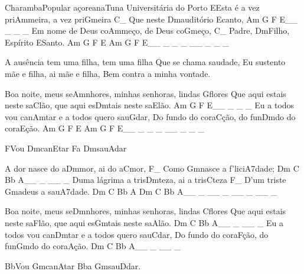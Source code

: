 \begin{musica}{Charamba}{Popular açoreana}{Tuna Universitária do Porto}
\ac{E}{Es}ta é a vez pri\ac{Am}{mei}ra, a vez pri\ac{G}{mei}ra \ac{C}{}_
Que neste \ac{Dm}{au}ditório \ac{E}{can}to, \ac{Am G F E}{}__ _ _ _
Em nome de Deus co\ac{Am}{me}ço, de Deus co\ac{G}{me}ço, \ac{C}{}_
Padre, \ac{Dm}{Fi}lho, Espírito \ac{E}{San}to. \ac{Am G F E Am G F E}{}__ _ _ _ __ _ _ _

A ausência tem uma filha, tem uma filha
Que se chama saudade,
Eu sustento mãe e filha, ai mãe e filha,
Bem contra a minha vontade.

Boa noite, meus se\ac{Am}{nho}res, minhas senhoras, lindas \ac{G}{flo}res
Que aqui estais neste sa\ac{C}{lão}, que aqui es\ac{Dm}{tais} neste sa\ac{E}{lão}. \ac{Am G F E}{}__ _ _ _
Eu a todos vou can\ac{Am}{tar} e a todos quero sau\ac{G}{dar},
Do fundo do cora\ac{C}{ção}, do fun\ac{Dm}{do} do cora\ac{E}{ção}. \ac{Am G F E Am G F E}{}__ _ _ _ __ _ _ _

\ac{F}{Vou} \ac{Dm}{ca}n\ac{E}{tar} \ac{F}{a} \ac{Dm}{sa}u\ac{A}{dar}

A dor nasce do a\ac{Dm}{mor}, ai do a\ac{C}{mor}, \ac{F}{}_
Como \ac{Gm}{nas}ce a f’lici\ac{A7}{da}de; \ac{Dm C Bb A}{}__ _ __ _
Duma lágrima a tris\ac{Dm}{te}za, ai a tris\ac{C}{te}za \ac{F}{}_
D’um triste \ac{Gm}{a}deus a sau\ac{A7}{da}de. \ac{Dm C Bb A Dm C Bb A}{}__ _ __ _ __ _ __ _

Boa noite, meus se\ac{Dm}{nho}res, minhas senhoras, lindas \ac{C}{flo}res
Que aqui estais neste sa\ac{F}{lão}, que aqui es\ac{Gm}{tais} neste sa\ac{A}{lão}. \ac{Dm C Bb A}{}__ _ __ _
Eu a todos vou can\ac{Dm}{tar} e a todos quero sau\ac{C}{dar},
Do fundo do cora\ac{F}{ção}, do fun\ac{Gm}{do} do cora\ac{A}{ção}. \ac{Dm C Bb A}{}__ _ __ _

\ac{Bb}{Vou} \ac{Gm}{ca}n\ac{A}{tar} \ac{Bb}{a} \ac{Gm}{sa}u\ac{D}{dar}.

\end{musica}

